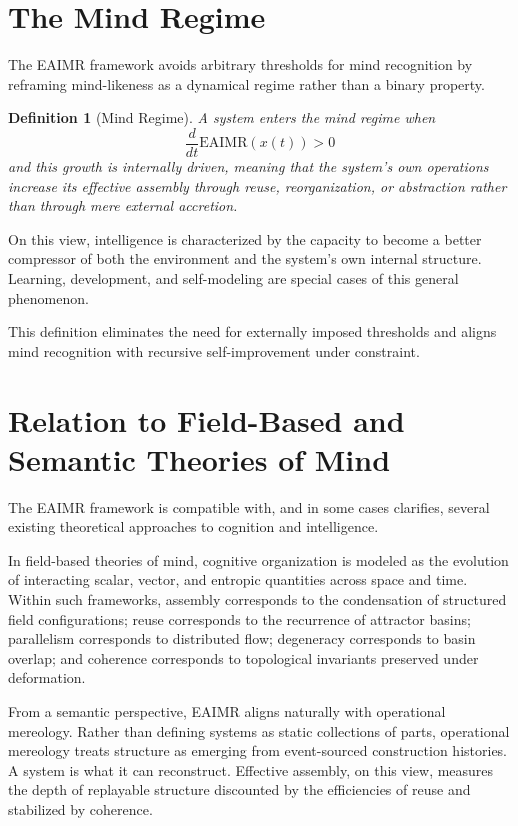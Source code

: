 \documentclass[11pt,letterpaper]{article}
\newtheorem{definition}{Definition}
\begin{document}
\section{The Mind Regime}

The EAIMR framework avoids arbitrary thresholds for mind recognition by reframing mind-likeness as a dynamical regime rather than a binary property.

\begin{definition}[Mind Regime]
A system enters the mind regime when
\[
\frac{d}{dt}\mathrm{EAIMR}(x(t)) > 0
\]
and this growth is internally driven, meaning that the system’s own operations increase its effective assembly through reuse, reorganization, or abstraction rather than through mere external accretion.
\end{definition}

On this view, intelligence is characterized by the capacity to become a better compressor of both the environment and the system’s own internal structure. Learning, development, and self-modeling are special cases of this general phenomenon.

This definition eliminates the need for externally imposed thresholds and aligns mind recognition with recursive self-improvement under constraint.

\section{Relation to Field-Based and Semantic Theories of Mind}

The EAIMR framework is compatible with, and in some cases clarifies, several existing theoretical approaches to cognition and intelligence.

In field-based theories of mind, cognitive organization is modeled as the evolution of interacting scalar, vector, and entropic quantities across space and time. Within such frameworks, assembly corresponds to the condensation of structured field configurations; reuse corresponds to the recurrence of attractor basins; parallelism corresponds to distributed flow; degeneracy corresponds to basin overlap; and coherence corresponds to topological invariants preserved under deformation.

From a semantic perspective, EAIMR aligns naturally with operational mereology. Rather than defining systems as static collections of parts, operational mereology treats structure as emerging from event-sourced construction histories. A system is what it can reconstruct. Effective assembly, on this view, measures the depth of replayable structure discounted by the efficiencies of reuse and stabilized by coherence.
\end{document}
